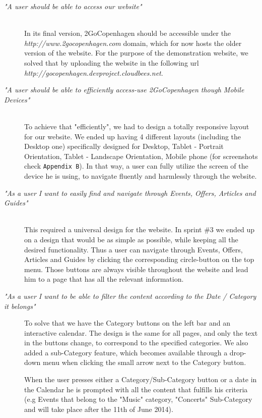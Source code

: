 \begin{description}
  \item[\emph{"A user should be able to access our website"}] \hfill \\
  In its final version, 2GoCopenhagen should be accessible under the \emph{http://www.2gocopenhagen.com} domain,  which for now hosts the older version of the website. For the purpose of the demonstration website, we solved that by uploading the website in the following url \emph{http://gocopenhagen.devproject.cloudbees.net}. 
  
  \item[\emph{"A user should be able to efficiently access-use 2GoCopenhagen though Mobile Devices"}] \hfill \\
  To achieve that "efficiently", we had to design a totally responsive layout for our website. We ended up having 4 different layouts (including the Desktop one) specifically designed for Desktop, Tablet - Portrait Orientation, Tablet - Landscape Orientation, Mobile phone (for screenshots check \verb|Appendix B|). In that way, a user can fully utilize the screen of the device he is using, to navigate fluently and harmlessly through the website.

  \item[\emph{"As a user I want to easily find and navigate through Events, Offers, Articles and Guides"}] \hfill \\
  This required a universal design for the website. In sprint \#3 we ended up on a design that would be as simple as possible, while keeping all the desired functionality. Thus a user can navigate through Events, Offers, Articles and Guides by clicking the corresponding circle-button on the top menu. Those buttons are always visible throughout the website and lead him to a page that has all the relevant information.
  
  \item[\emph{"As a user I want to be able to filter the content according to the Date / Category it belongs"}] 
  To solve that we have the Category buttons on the left bar and an interactive calendar. The design is the same for all pages, and only the text in the buttons change, to correspond to the specified categories. We also added a sub-Category feature, which becomes available through a drop-down menu when clicking the small arrow next to the Category button.
  
  When the user presses either a Category/Sub-Category button or a date in the Calendar he is prompted with all the content that fulfills his criteria (e.g Events that belong to the "Music" category, "Concerts" Sub-Category  and will take place after the 11th of June 2014).
  

\end{description}
